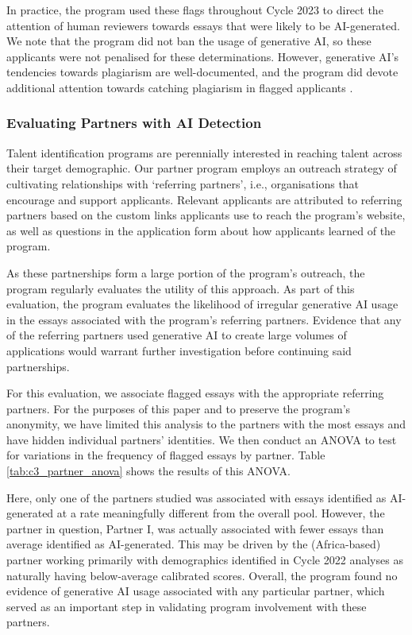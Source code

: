In practice, the program used these flags throughout Cycle 2023 to direct the attention of human reviewers towards essays that were likely to be AI-generated. We note that the program did not ban the usage of generative AI, so these applicants were not penalised for these determinations. However, generative AI's tendencies towards plagiarism are well-documented, and the program did devote additional attention towards catching plagiarism in flagged applicants \cite{dehouche_plagiarism_2021}.

\subsubsection{Evaluating Partners with AI Detection}
Talent identification programs are perennially interested in reaching talent across their target demographic. Our partner program employs an outreach strategy of cultivating relationships with `referring partners', i.e., organisations that encourage and support applicants. Relevant applicants are attributed to referring partners based on the custom links applicants use to reach the program's website, as well as questions in the application form about how applicants learned of the program.

As these partnerships form a large portion of the program's outreach, the program regularly evaluates the utility of this approach. As part of this evaluation, the program evaluates the likelihood of irregular generative AI usage in the essays associated with the program's referring partners. Evidence that any of the referring partners used generative AI to create large volumes of applications would warrant further investigation before continuing said partnerships.

For this evaluation, we associate flagged essays with the appropriate referring partners. For the purposes of this paper and to preserve the program's anonymity, we have limited this analysis to the partners with the most essays and have hidden individual partners' identities. We then conduct an ANOVA to test for variations in the frequency of flagged essays by partner. Table \ref{tab:c3_partner_anova} shows the results of this ANOVA.

Here, only one of the partners studied was associated with essays identified as AI-generated at a rate meaningfully different from the overall pool. However, the partner in question, Partner I, was actually associated with fewer essays than average identified as AI-generated. This may be driven by the (Africa-based) partner working primarily with demographics identified in Cycle 2022 analyses as naturally having below-average calibrated scores. Overall, the program found no evidence of generative AI usage associated with any particular partner, which served as an important step in validating program involvement with these partners.

